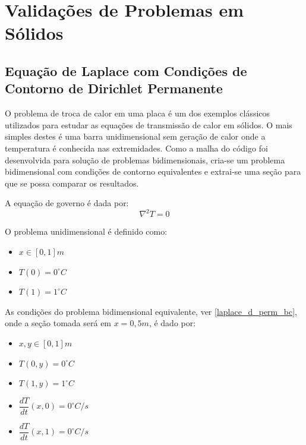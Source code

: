 \section{\textbf{Validações de Problemas em Sólidos}}

\subsection{\textbf{Equação de Laplace com Condições de Contorno de Dirichlet Permanente}}
O problema de troca de calor em uma placa é um dos exemplos clássicos utilizados para estudar as equações de transmissão de calor em sólidos. O mais simples destes é uma barra unidimensional sem geração de calor onde a temperatura é conhecida nas extremidades.
Como a malha do código foi desenvolvida para solução de problemas bidimensionais, cria-se um problema bidimensional com condições de contorno equivalentes e extrai-se uma seção para que se possa comparar os resultados.

A equação de governo é dada por:
\begin{equation}
    \nabla^2 T = 0
    \label{laplace_d_perm_eq} 
\end{equation}

O problema unidimensional é definido como:
\begin{itemize}
    \item $x\in [0,1]m$
    \item $T(0) = 0^{\circ}C$
    \item $T(1) = 1^{\circ}C$
\end{itemize}

As condições do problema bidimensional equivalente, ver \ref{laplace_d_perm_bc}, onde a seção tomada será em $x=0,5m$, é dado por:
\begin{itemize}
    \item $x,y\in [0,1]m$
    \item $T(0,y) = 0^{\circ}C$
    \item $T(1,y) = 1^{\circ}C$
    \item $\dfrac{dT}{dt}(x,0) = 0^{\circ}C/s$
    \item $\dfrac{dT}{dt}(x,1) = 0^{\circ}C/s$
\end{itemize}

